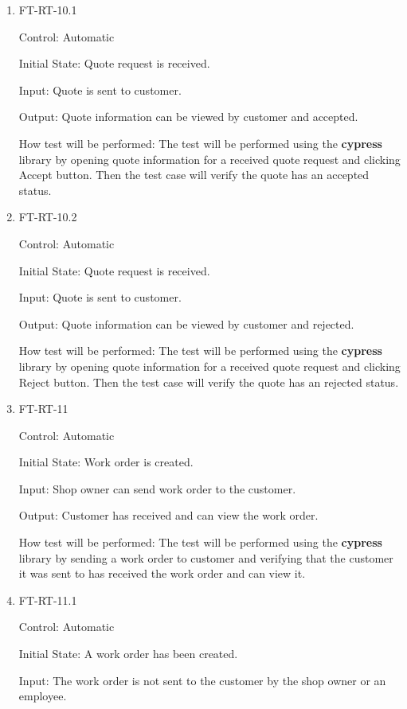 \documentclass[12pt, titlepage]{article}
\begin{document}
\begin{enumerate}
\item{FT-RT-10.1\\}

Control: Automatic
					
Initial State: Quote request is received.
					
Input: Quote is sent to customer.
					
Output: Quote information can be viewed by customer and accepted.

How test will be performed: The test will be performed using the \textbf{cypress} library by opening quote information for a received quote request and clicking Accept button. Then the test case will verify the quote has an accepted status.

\item{FT-RT-10.2\\}

Control: Automatic
					
Initial State: Quote request is received.
					
Input: Quote is sent to customer.
					
Output: Quote information can be viewed by customer and rejected.

How test will be performed: The test will be performed using the \textbf{cypress} library by opening quote information for a received quote request and clicking Reject button. Then the test case will verify the quote has an rejected status.

\item{FT-RT-11\\}

Control: Automatic
					
Initial State: Work order is created.
					
Input: Shop owner can send work order to the customer.
					
Output: Customer has received and can view the work order.

How test will be performed: The test will be performed using the \textbf{cypress} library by sending a work order to customer and verifying that the customer it was sent to has received the work order and can view it.

\item{FT-RT-11.1\\}

Control: Automatic

Initial State: A work order has been created.

Input: The work order is not sent to the customer by the shop owner or an employee.


\end{enumerate}
\end{document}
